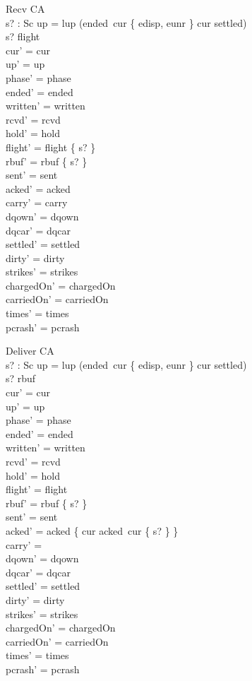 \documentclass[a4paper,10pt,fleqn]{article}
\begin{document}
\begin{schema}{Recv}
  \Delta CA \\
  s? : Sc
\where
  up = lup \lor (ended~cur \in \{ edisp, eunr \} \land cur \notin settled) \\
  s? \in flight \\
  cur' = cur \\
  up' = up \\
  phase' = phase \\
  ended' = ended \\
  written' = written \\
  rcvd' = rcvd \\
  hold' = hold \\
  flight' = flight \setminus \{ s? \} \\
  rbuf' = rbuf \cup \{ s? \} \\
  sent' = sent \\
  acked' = acked \\
  carry' = carry \\
  dqown' = dqown \\
  dqcar' = dqcar \\
  settled' = settled \\
  dirty' = dirty \\
  strikes' = strikes \\
  chargedOn' = chargedOn \\
  carriedOn' = carriedOn \\
  times' = times \\
  pcrash' = pcrash
\end{schema}

\begin{schema}{Deliver}
  \Delta CA \\
  s? : Sc
\where
  up = lup \lor (ended~cur \in \{ edisp, eunr \} \land cur \notin settled) \\
  s? \in rbuf \\
  cur' = cur \\
  up' = up \\
  phase' = phase \\
  ended' = ended \\
  written' = written \\
  rcvd' = rcvd \\
  hold' = hold \\
  flight' = flight \\
  rbuf' = rbuf \setminus \{ s? \} \\
  sent' = sent \\
  acked' = acked \oplus \{ cur \mapsto acked~cur \cup \{ s? \} \} \\
  carry' = \emptyset \\
  dqown' = dqown \\
  dqcar' = dqcar \\
  settled' = settled \\
  dirty' = dirty \\
  strikes' = strikes \\
  chargedOn' = chargedOn \\
  carriedOn' = carriedOn \\
  times' = times \\
  pcrash' = pcrash
\end{schema}
\end{document}
